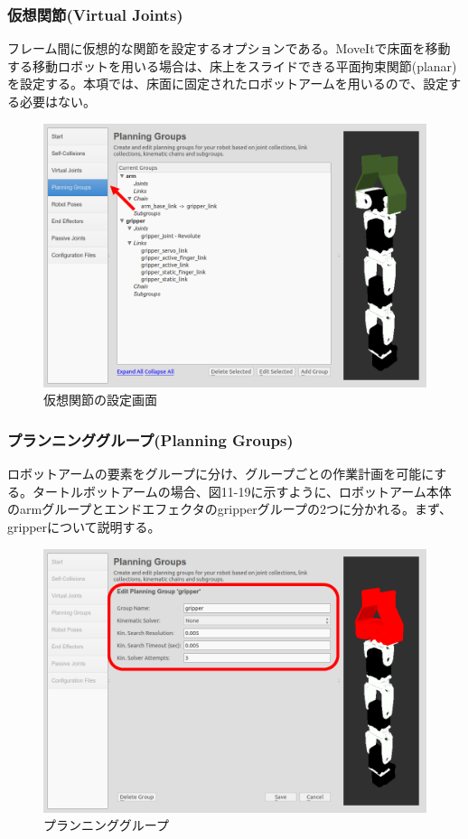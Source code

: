 \subsubsection{仮想関節(Virtual Joints)}

フレーム間に仮想的な関節を設定するオプションである。MoveItで床面を移動する移動ロボットを用いる場合は、床上をスライドできる平面拘束関節(planar)を設定する。本項では、床面に固定されたロボットアームを用いるので、設定する必要はない。

\begin{figure}[ht]
  \centering
  \includegraphics[width=\columnwidth]{pictures/chapter11/pic_11_18.png}
  \caption{仮想関節の設定画面}
\end{figure}

\subsubsection{プランニンググループ(Planning Groups)}

ロボットアームの要素をグループに分け、グループごとの作業計画を可能にする。タートルボットアームの場合、図11-19に示すように、ロボットアーム本体のarmグループとエンドエフェクタのgripperグループの2つに分かれる。まず、gripperについて説明する。

\begin{figure}[ht]
  \centering
  \includegraphics[width=\columnwidth]{pictures/chapter11/pic_11_19.png}
  \caption{プランニンググループ}
\end{figure}

